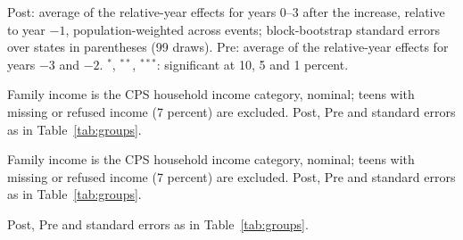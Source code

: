 \documentclass[12pt]{article}
\begin{document}
\begin{table}[H]
\centering
\caption{Effects of minimum wage increases on teen school--work status: post-event averages, 70 events, 2013--2024}
\label{tab:groups}
\small

\begin{tablenotes}\footnotesize
\item Post: average of the relative-year effects for years 0--3 after the increase, relative to year $-1$, population-weighted across events; block-bootstrap standard errors over states in parentheses (99 draws). Pre: average of the relative-year effects for years $-3$ and $-2$. $^{*}$, $^{**}$, $^{***}$: significant at 10, 5 and 1 percent.
\end{tablenotes}
\end{table}

\begin{table}[H]
\centering
\caption{Effects on school--work status, teens from families with income below \$50,000: post-event averages}
\label{tab:groupslow}
\small

\begin{tablenotes}\footnotesize
\item Family income is the CPS household income category, nominal; teens with missing or refused income (7 percent) are excluded. Post, Pre and standard errors as in Table~\ref{tab:groups}.
\end{tablenotes}
\end{table}

\begin{table}[H]
\centering
\caption{Effects on school--work status, teens from families with income of \$50,000 or more: post-event averages}
\label{tab:groupshigh}
\small

\begin{tablenotes}\footnotesize
\item Family income is the CPS household income category, nominal; teens with missing or refused income (7 percent) are excluded. Post, Pre and standard errors as in Table~\ref{tab:groups}.
\end{tablenotes}
\end{table}


\begin{table}[H]
\centering
\caption{Effects on school--work status, girls: post-event averages}
\label{tab:groupsfemale}
\small

\begin{tablenotes}\footnotesize
\item Post, Pre and standard errors as in Table~\ref{tab:groups}.
\end{tablenotes}
\end{table}
\end{document}
